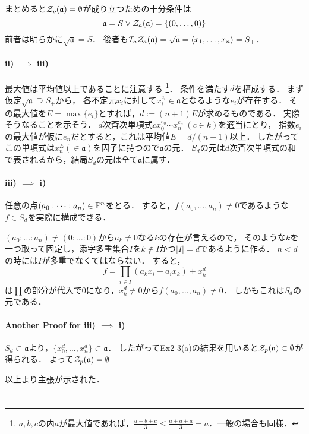 \documentclass[a4paper]{jarticle}
\newcommand{\I}[1]{\mathfrak{#1}}
\begin{document}
    まとめると$\zerosp(\I{a})=\emptyset$が成り立つための十分条件は
    \[ \I{a}=S \lor \zerosa(\I{a})=\{(0,\dots,0)\} \]
    前者は明らかに$\sqrt{\I{a}}=S$．
    後者も$\defsa \zerosa(\I{a})=\sqrt{\I{a}}=\langle x_1,\dots,x_n \rangle=S_{+}$．

    \paragraph{ii) $\implies$ iii)}
    最大値は平均値以上であることに注意する
    \footnote{$a,b,c$の内$a$が最大値であれば，$\frac{a+b+c}{3} \leq \frac{a+a+a}{3}=a$．一般の場合も同様．}．
    条件を満たす$d$を構成する．
    まず仮定$\sqrt{\I{a}} \supseteq S_{+}$から，
    各不定元$x_i$に対して$x_i^{e_i} \in \I{a}$となるような$e_i$が存在する．
    その最大値を$E=\max\{e_i\}$とすれば，$d:=(n+1)E$が求めるものである．
    実際そうなることを示そう．
    $d$次斉次単項式$c x_0^{e_0} \cdots x_n^{e_n}~(c \in k)$を適当にとり，
    指数$e_i$の最大値が仮に$e_n$だとすると，これは平均値$E=d/(n+1)$以上．
    したがってこの単項式は$x_n^{E}(\in \I{a})$を因子に持つので$\I{a}$の元．
    $S_d$の元は$d$次斉次単項式の和で表されるから，結局$S_d$の元は全て$\I{a}$に属す．

    \paragraph{iii) $\implies$ i)}
    任意の点$(a_0: \dots: a_n) \in \mathbb{P}^n$をとる．
    すると，$f(a_0, \dots, a_n) \neq 0$であるような$f \in S_d$を実際に構成できる．

    $(a_0: \dots: a_n) \neq (0:\dots:0)$から$a_k \neq 0$なる$k$の存在が言えるので，
    そのような$k$を一つ取って固定し，添字多重集合$I$を$k \not \in I$かつ$|I|=d$であるように作る．
    $n < d$の時には$I$が多重でなくてはならない．
    すると，
    \[ f=\prod_{i \in I}(a_k x_i- a_i x_k) +x_k^d\]
    は$\prod$の部分が代入で0になり，$x_k^d \neq 0$から$f(a_0, \dots, a_n) \neq 0$．
    しかもこれは$S_d$の元である．

    \paragraph{Another Proof for iii) $\implies$ i)}
    $S_d \subset \I{a}$より，$\{x_0^d, \dots, x_n^d \} \subset \I{a}$．
    したがってEx2-3(a)の結果を用いると$\zerosp(\I{a}) \subset \emptyset$が得られる．
    よって$\zerosp(\I{a})=\emptyset$

    以上より主張が示された．

\section{} %
\end{document}
